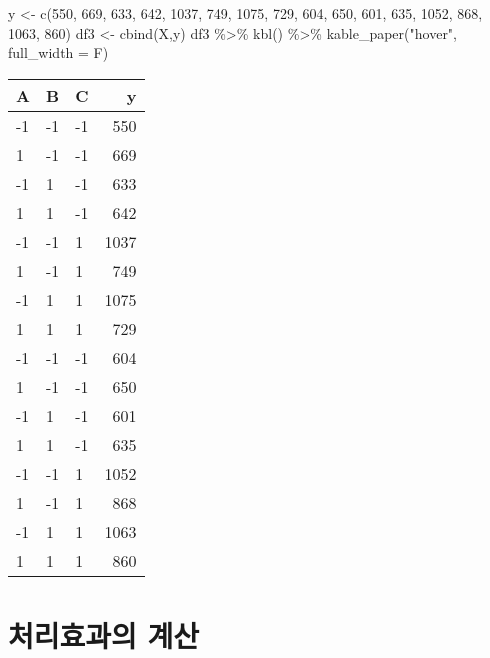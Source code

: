 \documentclass[
]{book}
\newenvironment{Shaded}{\begin{snugshade}}{\end{snugshade}}
\newcommand{\AttributeTok}[1]{\textcolor[rgb]{0.77,0.63,0.00}{#1}}
\newcommand{\DecValTok}[1]{\textcolor[rgb]{0.00,0.00,0.81}{#1}}
\newcommand{\FunctionTok}[1]{\textcolor[rgb]{0.00,0.00,0.00}{#1}}
\newcommand{\NormalTok}[1]{#1}
\newcommand{\OtherTok}[1]{\textcolor[rgb]{0.56,0.35,0.01}{#1}}
\newcommand{\SpecialCharTok}[1]{\textcolor[rgb]{0.00,0.00,0.00}{#1}}
\newcommand{\StringTok}[1]{\textcolor[rgb]{0.31,0.60,0.02}{#1}}
\begin{document}
\begin{Shaded}
\begin{Highlighting}[]
\NormalTok{y }\OtherTok{\textless{}{-}} \FunctionTok{c}\NormalTok{(}\DecValTok{550}\NormalTok{, }\DecValTok{669}\NormalTok{, }\DecValTok{633}\NormalTok{, }\DecValTok{642}\NormalTok{, }\DecValTok{1037}\NormalTok{, }\DecValTok{749}\NormalTok{, }\DecValTok{1075}\NormalTok{, }\DecValTok{729}\NormalTok{, }\DecValTok{604}\NormalTok{, }\DecValTok{650}\NormalTok{, }\DecValTok{601}\NormalTok{, }\DecValTok{635}\NormalTok{, }\DecValTok{1052}\NormalTok{, }\DecValTok{868}\NormalTok{, }\DecValTok{1063}\NormalTok{, }\DecValTok{860}\NormalTok{)}
\NormalTok{df3 }\OtherTok{\textless{}{-}} \FunctionTok{cbind}\NormalTok{(X,y)}
\NormalTok{df3 }\SpecialCharTok{\%\textgreater{}\%}  \FunctionTok{kbl}\NormalTok{() }\SpecialCharTok{\%\textgreater{}\%}   \FunctionTok{kable\_paper}\NormalTok{(}\StringTok{"hover"}\NormalTok{, }\AttributeTok{full\_width =}\NormalTok{ F)}
\end{Highlighting}
\end{Shaded}

\begin{table}
\centering
\begin{tabular}[t]{l|l|l|r}
\hline
A & B & C & y\\
\hline
-1 & -1 & -1 & 550\\
\hline
1 & -1 & -1 & 669\\
\hline
-1 & 1 & -1 & 633\\
\hline
1 & 1 & -1 & 642\\
\hline
-1 & -1 & 1 & 1037\\
\hline
1 & -1 & 1 & 749\\
\hline
-1 & 1 & 1 & 1075\\
\hline
1 & 1 & 1 & 729\\
\hline
-1 & -1 & -1 & 604\\
\hline
1 & -1 & -1 & 650\\
\hline
-1 & 1 & -1 & 601\\
\hline
1 & 1 & -1 & 635\\
\hline
-1 & -1 & 1 & 1052\\
\hline
1 & -1 & 1 & 868\\
\hline
-1 & 1 & 1 & 1063\\
\hline
1 & 1 & 1 & 860\\
\hline
\end{tabular}
\end{table}

\hypertarget{uxcc98uxb9acuxd6a8uxacfcuxc758-uxacc4uxc0b0-2}{%
\section{처리효과의 계산}\label{uxcc98uxb9acuxd6a8uxacfcuxc758-uxacc4uxc0b0-2}}
\end{document}
